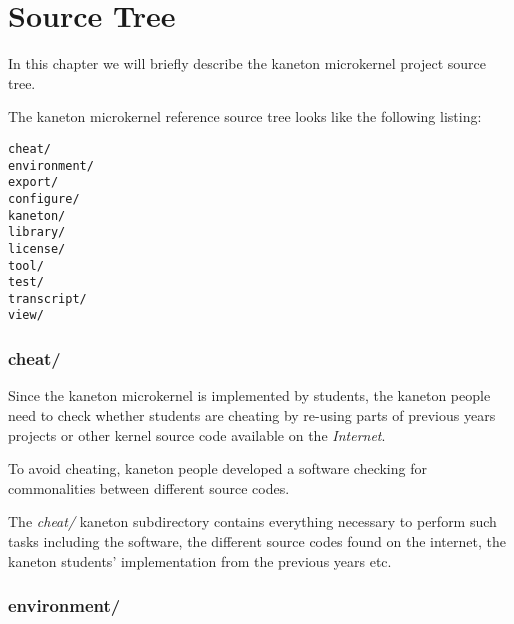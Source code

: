 %
%
%
%
%
%

%
%

\chapter{Source Tree}

In this chapter we will briefly describe the kaneton microkernel project
source tree.

\newpage

%
%

The kaneton microkernel reference source tree looks like the following
listing:

\begin{verbatim}
cheat/
environment/
export/
configure/
kaneton/
library/
license/
tool/
test/
transcript/
view/
\end{verbatim}


\subsection*{cheat/}

Since the kaneton microkernel is implemented by students, the kaneton
people need to check whether students are cheating by re-using parts of
previous years projects or other kernel source code available on the
\textit{Internet}.

To avoid cheating, kaneton people developed a software checking for
commonalities between different source codes.

The \textit{cheat/} kaneton subdirectory contains everything necessary
to perform such tasks including the software, the different source codes
found on the internet, the kaneton students' implementation from the
previous years etc.


\subsection*{environment/}

